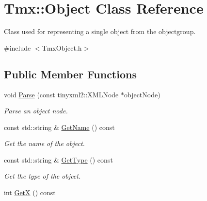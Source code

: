 \hypertarget{classTmx_1_1Object}{\section{Tmx\-:\-:Object Class Reference}
\label{classTmx_1_1Object}
}


Class used for representing a single object from the objectgroup.  




{\ttfamily \#include $<$Tmx\-Object.\-h$>$}

\subsection*{Public Member Functions}
\begin{DoxyCompactItemize}
\item 
\hypertarget{classTmx_1_1Object_a7065e21be60a3534997bc89648407d48}{void \hyperlink{classTmx_1_1Object_a7065e21be60a3534997bc89648407d48}{Parse} (const tinyxml2\-::\-X\-M\-L\-Node $\ast$object\-Node)}\label{classTmx_1_1Object_a7065e21be60a3534997bc89648407d48}

\begin{DoxyCompactList}\small\item\em Parse an object node. \end{DoxyCompactList}\item 
\hypertarget{classTmx_1_1Object_ada7d925bd462b3b8b7ddedf0e8891a3d}{const std\-::string \& \hyperlink{classTmx_1_1Object_ada7d925bd462b3b8b7ddedf0e8891a3d}{Get\-Name} () const }\label{classTmx_1_1Object_ada7d925bd462b3b8b7ddedf0e8891a3d}

\begin{DoxyCompactList}\small\item\em Get the name of the object. \end{DoxyCompactList}\item 
\hypertarget{classTmx_1_1Object_a99cb9247d2bebbe45c7cccc58cf47737}{const std\-::string \& \hyperlink{classTmx_1_1Object_a99cb9247d2bebbe45c7cccc58cf47737}{Get\-Type} () const }\label{classTmx_1_1Object_a99cb9247d2bebbe45c7cccc58cf47737}

\begin{DoxyCompactList}\small\item\em Get the type of the object. \end{DoxyCompactList}\item 
\hypertarget{classTmx_1_1Object_a4491f0abc015b7fb1c845bae7dc6008d}{int \hyperlink{classTmx_1_1Object_a4491f0abc015b7fb1c845bae7dc6008d}{Get\-X} () const }\label{classTmx_1_1Object_a4491f0abc015b7fb1c845bae7dc6008d}


\end{DoxyCompactItemize}
